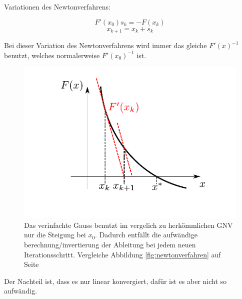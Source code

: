 \documentclass[10pt,a4paper]{article}
\begin{document}
Variationen des Newtonverfahrens:

\begin{defi}

$$F'(x_0)s_k=-F(x_k)$$
$$x_{k+1}=x_k+s_k$$

Bei dieser Variation des Newtonverfahrens wird immer das gleiche $F'(x)^{-1}$ benutzt, welches normalerweise $F'(x_0)^{-1}$ ist.

\begin{figure}[H]
\includegraphics[width=\textwidth]{images/newton_verfahren_simplified}
\caption{Das verinfachte Gauss benutzt im vergelich zu herkömmlichen GNV nur die Steigung bei $x_0$. Dadurch entfällt die aufwändige berechnung/invertierung der Ableitung bei jedem neuen Iterationsschritt. Vergleiche Abbildung \ref{fig:newtonverfahren} auf Seite \pageref{fig:newtonverfahren}}
\end{figure}

Der Nachteil ist, dass es nur linear konvergiert, dafür ist es aber nicht so aufwändig.

\end{defi}
\end{document}
